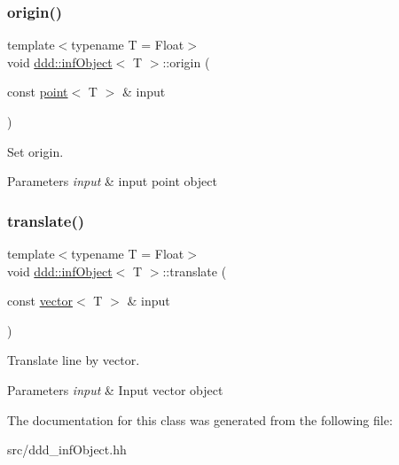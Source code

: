 \subsubsection{\texorpdfstring{origin()}{origin()}}
{\footnotesize\ttfamily template$<$typename T = Float$>$ \\
void \hyperlink{classddd_1_1inf_object}{ddd\+::inf\+Object}$<$ T $>$\+::origin (\begin{DoxyParamCaption}\item[{const \hyperlink{classddd_1_1point}{point}$<$ T $>$ \&}]{input }\end{DoxyParamCaption})\hspace{0.3cm}{\ttfamily [inline]}}



Set origin. 


\begin{DoxyParams}{Parameters}
{\em input} & input point object \\
\hline
\end{DoxyParams}
\mbox{\label{classddd_1_1inf_object_a3cb132ed31c87d7a746993e58881c745}} 
\subsubsection{\texorpdfstring{translate()}{translate()}}
{\footnotesize\ttfamily template$<$typename T = Float$>$ \\
void \hyperlink{classddd_1_1inf_object}{ddd\+::inf\+Object}$<$ T $>$\+::translate (\begin{DoxyParamCaption}\item[{const \hyperlink{classddd_1_1vector}{vector}$<$ T $>$ \&}]{input }\end{DoxyParamCaption})\hspace{0.3cm}{\ttfamily [inline]}}



Translate line by vector. 


\begin{DoxyParams}{Parameters}
{\em input} & Input vector object \\
\hline
\end{DoxyParams}


The documentation for this class was generated from the following file\+:\begin{DoxyCompactItemize}
\item 
src/ddd\+\_\+inf\+Object.\+hh\end{DoxyCompactItemize}
